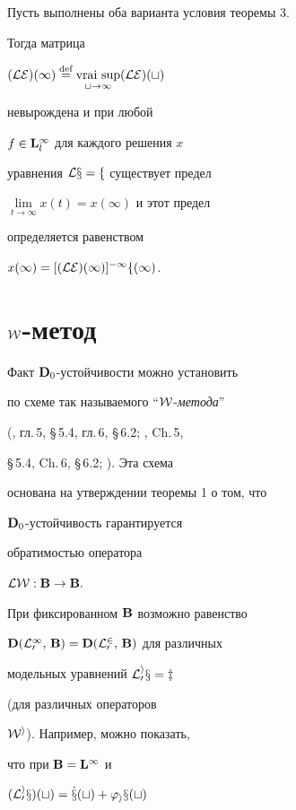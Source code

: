 \begin{cornonum} Пусть выполнены оба варианта условия теоремы 3.


Тогда матрица


$(\cal L E)(\infty)\eqdef\vraisup\limits_{t\to\infty}(\cal L E)(t)$


невырождена и при любой


$f\in\bold L_l^\infty$ для каждого решения $x$


уравнения $\cal L x=f$ существует предел


$\lim\limits_{t\to\infty}x(t)=x(\infty)$ и этот предел


определяется равенством


$x(\infty)=[(\cal L E)(\infty)]^{-1}f(\infty)$.


\end{cornonum}





\section{$\cal W$-метод}





Факт ${\bold D}_0$-устойчивости можно установить


по схеме так называемого ``$\cal W$-{\it метода}''


(\cite{Az1}, гл.\,5, \S\,5.4, гл.\,6, \S\,6.2; \cite{Az2}, Ch.\,5,


\S\,5.4, Ch.\,6, \S\,6.2; \cite{Az4}). Эта схема


основана на утверждении теоремы 1 о том, что


$\bold D_0$-устойчивость гарантируется


обратимостью оператора


$\cal L W:\bold B\to\bold B.$





При фиксированном $\bold B$ возможно равенство


$\bold D(\cal L_0^1,\,\bold B)=\bold D(\cal L_0^2,\,\bold B)$ для различных


модельных уравнений $\cal L_0^i x = z$


(для различных операторов


$\cal W^i$). Например, можно показать,


что при $\bold B=\bold L^\infty$ и


$(\cal L_0^i x)(t) = \Dot x(t) + \varphi_i x(t)$


